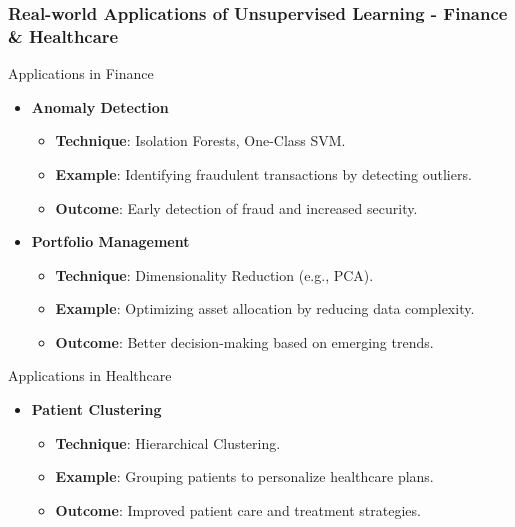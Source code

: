 \documentclass[aspectratio=169]{beamer}
\begin{document}
\begin{frame}[fragile]
  \frametitle{Real-world Applications of Unsupervised Learning - Finance & Healthcare}
  \begin{block}{Applications in Finance}
    \begin{itemize}
        \item \textbf{Anomaly Detection}
        \begin{itemize}
            \item \textbf{Technique}: Isolation Forests, One-Class SVM.
            \item \textbf{Example}: Identifying fraudulent transactions by detecting outliers.
            \item \textbf{Outcome}: Early detection of fraud and increased security.
        \end{itemize}
        \item \textbf{Portfolio Management}
        \begin{itemize}
            \item \textbf{Technique}: Dimensionality Reduction (e.g., PCA).
            \item \textbf{Example}: Optimizing asset allocation by reducing data complexity.
            \item \textbf{Outcome}: Better decision-making based on emerging trends.
        \end{itemize}
    \end{itemize}
  \end{block}
  
  \begin{block}{Applications in Healthcare}
    \begin{itemize}
        \item \textbf{Patient Clustering}
        \begin{itemize}
            \item \textbf{Technique}: Hierarchical Clustering.
            \item \textbf{Example}: Grouping patients to personalize healthcare plans.
            \item \textbf{Outcome}: Improved patient care and treatment strategies.
        \end{itemize}
    \end{itemize}
  \end{block}
\end{frame}
\end{document}
